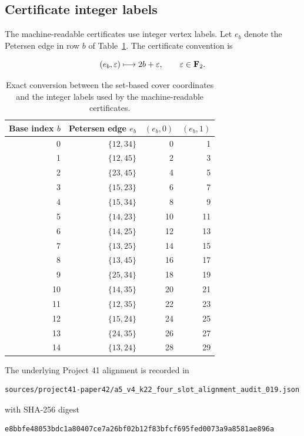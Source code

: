 \subsection{Certificate integer labels}

The machine-readable certificates use integer vertex labels. Let
\(e_b\) denote the Petersen edge in row \(b\) of
Table~\ref{tab:certificate-label-map}. The certificate convention is

\[
(e_b,\varepsilon)
\longmapsto
2b+\varepsilon,
\qquad
\varepsilon\in\mathbf F_2.
\]

\begin{table}[h]
\centering
\begin{tabular}{rrrr}
\toprule
Base index \(b\) & Petersen edge \(e_b\) &
\((e_b,0)\) & \((e_b,1)\)\\
\midrule
0 & $\{12,34\}$ & 0 & 1\\
1 & $\{12,45\}$ & 2 & 3\\
2 & $\{23,45\}$ & 4 & 5\\
3 & $\{15,23\}$ & 6 & 7\\
4 & $\{15,34\}$ & 8 & 9\\
5 & $\{14,23\}$ & 10 & 11\\
6 & $\{14,25\}$ & 12 & 13\\
7 & $\{13,25\}$ & 14 & 15\\
8 & $\{13,45\}$ & 16 & 17\\
9 & $\{25,34\}$ & 18 & 19\\
10 & $\{14,35\}$ & 20 & 21\\
11 & $\{12,35\}$ & 22 & 23\\
12 & $\{15,24\}$ & 24 & 25\\
13 & $\{24,35\}$ & 26 & 27\\
14 & $\{13,24\}$ & 28 & 29\\
\bottomrule
\end{tabular}
\caption{Exact conversion between the set-based cover coordinates and the
integer labels used by the machine-readable certificates.}
\label{tab:certificate-label-map}
\end{table}

The underlying Project 41 alignment is recorded in

\begin{verbatim}
sources/project41-paper42/a5_v4_k22_four_slot_alignment_audit_019.json
\end{verbatim}

with SHA-256 digest

\begin{verbatim}
e8bbfe48053bdc1a80407ce7a26bf02b12f83bfcf695fed0073a9a8581ae896a
\end{verbatim}

